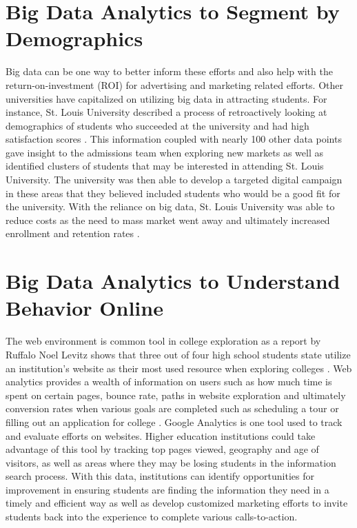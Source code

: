 \documentclass[sigconf]{acmart}
\begin{document}
\section{Big Data Analytics to Segment by Demographics}
Big data can be one way to better inform these efforts and also help with the return-on-investment (ROI) for advertising and marketing related efforts. Other universities have capitalized on utilizing big data in attracting students. For instance, St. Louis University described a process of retroactively looking at demographics of students who succeeded at the university and had high satisfaction scores \cite{Selingo2017}. This information coupled with nearly 100 other data points gave insight to the admissions team when exploring new markets as well as identified clusters of students that may be interested in attending St. Louis University. The university was then able to develop a targeted digital campaign in these areas that they believed included students who would be a good fit for the university. With the reliance on big data, St. Louis University was able to reduce costs as the need to mass market went away and ultimately increased enrollment and retention rates \cite{Selingo2017}.  

\section{Big Data Analytics to Understand Behavior Online}
The web environment is common tool in college exploration as a report by Ruffalo Noel Levitz shows that three out of four high school students state utilize an institution's website as their most used resource when exploring colleges \cite{Geyer2016}. Web analytics provides a wealth of information on users such as how much time is spent on certain pages, bounce rate, paths in website exploration and ultimately conversion rates when various goals are completed such as scheduling a tour or filling out an application for college \cite{Omidvar2011}. Google Analytics is one tool used to track and evaluate efforts on websites. Higher education institutions could take advantage of this tool by tracking top pages viewed, geography and age of visitors, as well as areas where they may be losing students in the information search process. With this data, institutions can identify opportunities for improvement in ensuring students are finding the information they need in a timely and efficient way as well as develop customized marketing efforts to invite students back into the experience to complete various calls-to-action. 
\end{document}
